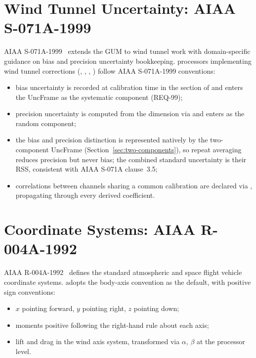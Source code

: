 \section{Wind Tunnel Uncertainty: AIAA S-071A-1999}

AIAA S-071A-1999~\citep{aiaaS071A} extends the GUM to wind tunnel work
with domain-specific guidance on bias and precision uncertainty
bookkeeping. \itc{} processors implementing wind tunnel corrections
(, , ,
) follow AIAA S-071A-1999 conventions:

\begin{itemize}[noitemsep,topsep=2pt]
  \item bias uncertainty is recorded at calibration time in the
    \code{[uncertainties]} section of  and enters the
    UncFrame as the systematic component (REQ-99);
  \item precision uncertainty is computed from the 
    dimension via  and enters as the random
    component;
  \item the bias and precision distinction is represented natively by the
    two-component UncFrame (Section~\ref{sec:two-components}), so repeat
    averaging reduces precision but never bias; the combined standard
    uncertainty is their RSS, consistent with AIAA S-071A clause~3.5;
  \item correlations between channels sharing a common calibration are
    declared via , propagating through every
    derived coefficient.
\end{itemize}

\section{Coordinate Systems: AIAA R-004A-1992}

AIAA R-004A-1992~\citep{aiaaR004A} defines the standard atmospheric and
space flight vehicle coordinate systems. \itc{} adopts the body-axis
convention as the default, with positive sign conventions:

\begin{itemize}[noitemsep,topsep=2pt]
  \item $x$ pointing forward, $y$ pointing right, $z$ pointing down;
  \item moments positive following the right-hand rule about each axis;
  \item lift and drag in the wind axis system, transformed via
    $\alpha$, $\beta$ at the processor level.
\end{itemize}

